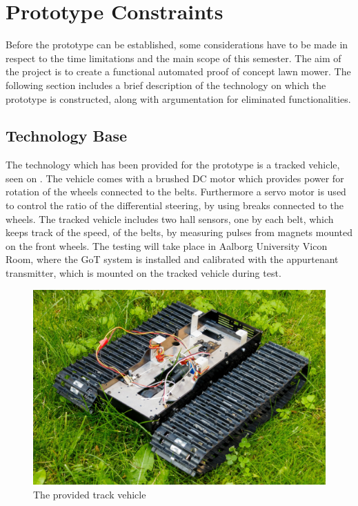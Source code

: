 \section{Prototype Constraints}
Before the prototype can be established, some considerations have to be made in respect to the time limitations and the main scope of this semester. The aim of the project is to create a functional automated proof of concept lawn mower. The following section includes a brief description of the technology on which the prototype is constructed, along with argumentation for eliminated functionalities.

\subsection{Technology Base}
The technology which has been provided for the prototype is a tracked vehicle, seen on . The vehicle comes with a brushed DC motor which provides power for rotation of the wheels connected to the belts. Furthermore a servo motor is used to control the ratio of the differential steering, by using breaks connected to the wheels. The tracked vehicle includes two hall sensors, one by each belt, which keeps track of the speed, of the belts, by measuring pulses from magnets mounted on the front wheels. The testing will take place in Aalborg University Vicon Room, where the GoT system is installed and calibrated with the appurtenant transmitter, which is mounted on the tracked vehicle during test.

\begin{figure}[H]
	\centering
	\includegraphics[scale=0.8]{figures/BeltVehicle.jpg}
	\caption{The provided track vehicle}
	\label{TrackedVehicle}
\end{figure}

